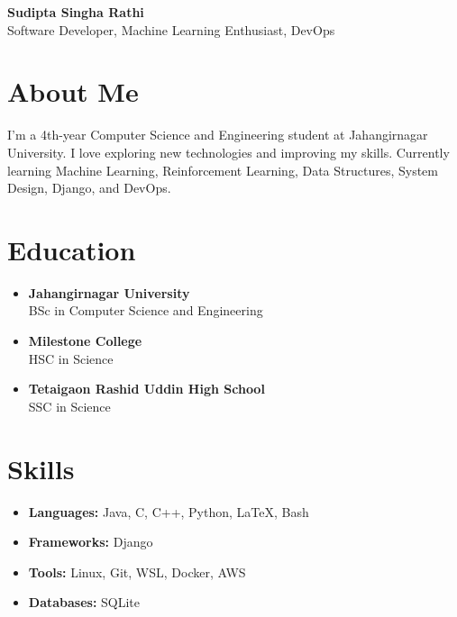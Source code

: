 \documentclass[a4paper,10pt]{article}
\begin{document}
\begin{minipage}{0.72\textwidth}
    {\LARGE\bfseries Sudipta Singha Rathi}\\[0.5em]
    {\large{Software Developer, Machine Learning Enthusiast, DevOps}}
\end{minipage}%
\hfill
\begin{minipage}{0.23\textwidth}
    \centering
\end{minipage}

\section*{About Me}
I'm a 4th-year Computer Science and Engineering student at Jahangirnagar University. I love exploring new technologies and improving my skills.
Currently learning Machine Learning, Reinforcement Learning, Data Structures, System Design, Django, and DevOps.

\section*{Education}
\begin{itemize}[leftmargin=0.5cm]
    \item \textbf{Jahangirnagar University}\\
    BSc in Computer Science and Engineering
    \item \textbf{Milestone College}\\
    HSC in Science
    \item \textbf{Tetaigaon Rashid Uddin High School}\\
    SSC in Science
\end{itemize}

\section*{Skills}
\begin{itemize}[leftmargin=0.5cm]
    \item \textbf{Languages:} Java, C, C++, Python, LaTeX, Bash
    \item \textbf{Frameworks:} Django
    \item \textbf{Tools:} Linux, Git, WSL, Docker, AWS
    \item \textbf{Databases:} SQLite
\end{itemize}
\end{document}
